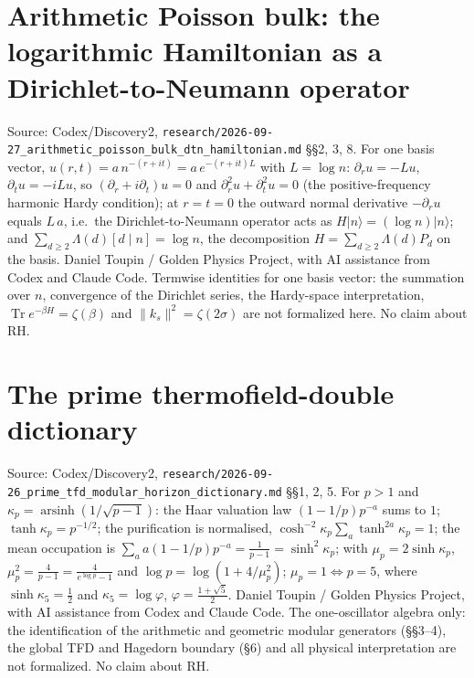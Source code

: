 \documentclass{report}
\theoremstyle{definition}
\begin{document}
\begin{itemize}
\begin{itemize}
\section{Arithmetic Poisson bulk: the logarithmic Hamiltonian as a Dirichlet-to-Neumann operator}
Source: Codex/Discovery2, \texttt{research/2026-09-27\_arithmetic\_poisson\_bulk\_dtn\_hamiltonian.md} \S\S2, 3, 8. For one basis vector, $u(r,t)=a\,n^{-(r+it)}=a\,e^{-(r+it)L}$ with $L=\log n$: $\partial_ru=-Lu$, $\partial_tu=-iLu$, so $(\partial_r+i\partial_t)u=0$ and $\partial_r^2u+\partial_t^2u=0$ (the positive-frequency harmonic Hardy condition);
at $r=t=0$ the outward normal derivative $-\partial_ru$ equals $L\,a$, i.e.\ the Dirichlet-to-Neumann operator acts as $H|n\rangle=(\log n)|n\rangle$; and $\sum_{d\ge2}\Lambda(d)[d\mid n]=\log n$, the decomposition $H=\sum_{d\ge2}\Lambda(d)P_d$ on the basis.
Daniel Toupin / Golden Physics Project, with AI assistance from Codex and Claude Code. Termwise identities for one basis vector: the summation over $n$, convergence of the Dirichlet series, the Hardy-space interpretation, $\operatorname{Tr}e^{-\beta H}=\zeta(\beta)$ and $\|k_s\|^2=\zeta(2\sigma)$ are not formalized here. No claim about RH.

\section{The prime thermofield-double dictionary}
Source: Codex/Discovery2, \texttt{research/2026-09-26\_prime\_tfd\_modular\_horizon\_dictionary.md} \S\S1, 2, 5. For $p>1$ and $\kappa_p=\operatorname{arsinh}(1/\sqrt{p-1})$: the Haar valuation law $(1-1/p)p^{-a}$ sums to $1$; $\tanh\kappa_p=p^{-1/2}$; the purification is normalised, $\cosh^{-2}\kappa_p\sum_a\tanh^{2a}\kappa_p=1$;
the mean occupation is $\sum_aa(1-1/p)p^{-a}=\frac1{p-1}=\sinh^2\kappa_p$; with $\mu_p=2\sinh\kappa_p$, $\mu_p^2=\frac4{p-1}=\frac4{e^{\log p}-1}$ and $\log p=\log(1+4/\mu_p^2)$; $\mu_p=1\iff p=5$, where $\sinh\kappa_5=\tfrac12$ and $\kappa_5=\log\varphi$, $\varphi=\frac{1+\sqrt5}2$.
Daniel Toupin / Golden Physics Project, with AI assistance from Codex and Claude Code. The one-oscillator algebra only: the identification of the arithmetic and geometric modular generators (\S\S3--4), the global TFD and Hagedorn boundary (\S6) and all physical interpretation are not formalized. No claim about RH.


\end{itemize}
\end{itemize}
\end{document}
